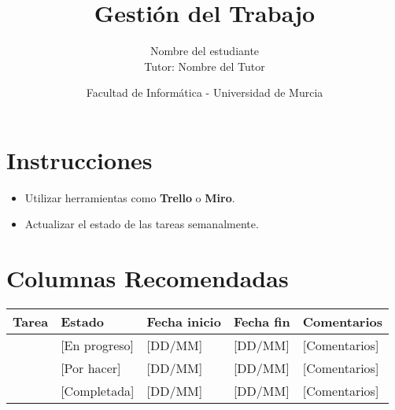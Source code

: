 \documentclass[12pt, a4paper]{article}
\title{\textbf{Gestión del Trabajo}}
\author{Nombre del estudiante \\ Tutor: Nombre del Tutor}
\date{Facultad de Informática - Universidad de Murcia}
\begin{document}
\maketitle

\section*{Instrucciones}
\begin{itemize}
    \item Utilizar herramientas como \textbf{Trello} o \textbf{Miro}.
    \item Actualizar el estado de las tareas semanalmente.
\end{itemize}

\section*{Columnas Recomendadas}
\begin{tabular}{|l|l|l|l|l|}
    \hline
    \textbf{Tarea} & \textbf{Estado} & \textbf{Fecha inicio} & \textbf{Fecha fin} & \textbf{Comentarios} \\ \hline
    [Tarea 1] & [En progreso] & [DD/MM] & [DD/MM] & [Comentarios] \\ \hline
    [Tarea 2] & [Por hacer] & [DD/MM] & [DD/MM] & [Comentarios] \\ \hline
    [Tarea 3] & [Completada] & [DD/MM] & [DD/MM] & [Comentarios] \\ \hline
\end{tabular}
\end{document}
